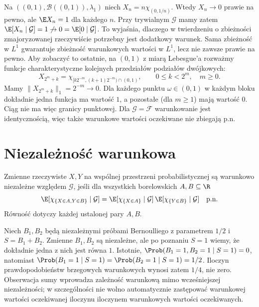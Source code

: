\begin{przyklad}
Na $((0,1),\mathcal B((0,1)),\lambda_1)$ niech
$X_n=n\chi_{(0,1/n)}$. Wtedy $X_n\to0$ prawie na pewno,
ale $\E X_n=1$ dla każdego $n$.
Przy trywialnym $\mathcal G$ mamy zatem
$\E[X_n\mid\mathcal G]=1\not\to0=\E[0\mid\mathcal G]$.
To wyjaśnia, dlaczego w twierdzeniu o zbieżności zmajoryzowanej
rzeczywiście potrzebny jest dodatkowy warunek. Sama
zbieżność w $L^1$ gwarantuje zbieżność warunkowych wartości
w $L^1$, lecz nie zawsze prawie na pewno.
Aby zobaczyć to ostatnie, na $(0,1)$ z miarą
Lebesgue'a rozważmy funkcje charakterystyczne
kolejnych przedziałów podziałów dwójkowych:
\[
X_{2^m+k}=\chi_{[k2^{-m},(k+1)2^{-m})\cap(0,1)},
\qquad 0\leq k<2^m,\quad m\geq0.
\]
Mamy $\|X_{2^m+k}\|_1=2^{-m}\to0$.
Dla każdego punktu $\omega\in(0,1)$ w każdym
bloku dokładnie jedna funkcja ma wartość $1$,
a pozostałe (dla $m\geq1$) mają wartość $0$.
Ciąg nie ma więc granicy punktowej. Dla
$\mathcal G=\mathcal F$ warunkowanie jest identycznością,
więc także warunkowe wartości oczekiwane nie zbiegają p.n.
\end{przyklad}



\section{Niezależność warunkowa}

\begin{definicja}
Zmienne rzeczywiste $X,Y$ na wspólnej przestrzeni
probabilistycznej są warunkowo niezależne względem
$\mathcal G$, jeśli dla wszystkich borelowskich
$A,B\subseteq\R$
\[
\E[\chi_{\{X\in A,Y\in B\}}\mid\mathcal G]
=\E[\chi_{\{X\in A\}}\mid\mathcal G]\,
 \E[\chi_{\{Y\in B\}}\mid\mathcal G]\quad\text{p.n.}
\]
Równość dotyczy każdej ustalonej pary $A,B$.
\end{definicja}

\begin{przyklad}
Niech $B_1,B_2$ będą niezależnymi próbami Bernoulliego
z parametrem $1/2$ i $S=B_1+B_2$.
Zmienne $B_1,B_2$ są niezależne, ale po poznaniu
$S=1$ wiemy, że dokładnie jedna z nich jest równa $1$.
Istotnie,
$\Prob(B_1=1,B_2=1\mid S=1)=0$, natomiast
$\Prob(B_1=1\mid S=1)=\Prob(B_2=1\mid S=1)=1/2$.
Iloczyn prawdopodobieństw brzegowych warunkowych
wynosi zatem $1/4$, nie zero. Obserwacja sumy
wprowadza zależność warunkową mimo wcześniejszej
niezależności; w szczególności nie wolno automatycznie
zastępować warunkowej wartości oczekiwanej iloczynu
iloczynem warunkowych wartości oczekiwanych.
\end{przyklad}

